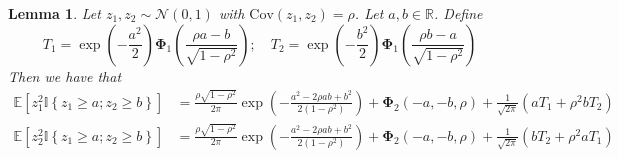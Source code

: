 \documentclass[10pt]{article} %
\newtheorem{lemma}[theorem]{Lemma}
\theoremstyle{definition}
\theoremstyle{plain}
\newcommand{\paren}[1]{\left(#1\right)}
\newcommand{\indy}[1]{\mathbb{I}\left\{#1\right\}}
\providecommand{\E}{\mathbb{E}}
\providecommand{\R}{\mathbb{R}}
\begin{document}
\begin{lemma}
    \label{lem:sq_term_exp}
    Let $z_1, z_2\sim\mathcal{N}\paren{0, 1}$ with $\text{Cov}\paren{z_1, z_2} = \rho$. Let $a, b \in\R$. Define
    \[
        T_1 = \exp\paren{-\frac{a^2}{2}}\bm{\Phi}_1\paren{\frac{\rho a - b}{\sqrt{1-\rho^2}}};\quad T_2 = \exp\paren{-\frac{b^2}{2}}\bm{\Phi}_1\paren{\frac{\rho b - a}{\sqrt{1-\rho^2}}}
    \]
    Then we have that
    \begin{align*}
        \E\left[z_1^2\indy{z_1\geq a; z_2\geq b}\right] & = \frac{\rho\sqrt{1-\rho^2}}{2\pi}\exp\paren{-\frac{a^2 - 2\rho ab + b^2}{2\paren{1-\rho^2}}} + \bm{\Phi}_2\paren{-a,-b,\rho} + \frac{1}{\sqrt{2\pi}}\paren{aT_1 + \rho^2 bT_2}\\
        \E\left[z_2^2\indy{z_1\geq a; z_2\geq b}\right] & = \frac{\rho\sqrt{1-\rho^2}}{2\pi}\exp\paren{-\frac{a^2 - 2\rho ab + b^2}{2\paren{1-\rho^2}}} + \bm{\Phi}_2\paren{-a,-b,\rho} + \frac{1}{\sqrt{2\pi}}\paren{bT_2 + \rho^2 aT_1}
    \end{align*}
\end{lemma}
\end{document}
